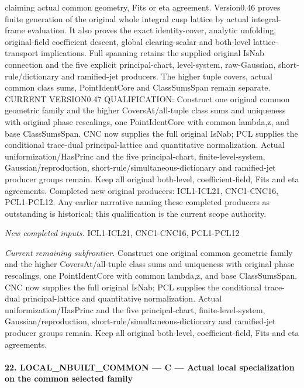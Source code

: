 claiming actual common geometry, Fits or eta agreement. Version0.46 proves finite generation of the original whole integral cusp lattice by actual integral-frame evaluation. It also proves the exact identity-cover, analytic unfolding, original-field coefficient descent, global clearing-scalar and both-level lattice-transport implications. Full spanning retains the supplied original IsNab connection and the five explicit principal-chart, level-system, raw-Gaussian, short-rule/dictionary and ramified-jet producers. The higher tuple covers, actual common class sums, PointIdentCore and ClassSumsSpan remain separate. CURRENT VERSION0.47 QUALIFICATION: Construct one original common geometric family and the higher CoversAt/all-tuple class sums and uniqueness with original phase rescalings, one PointIdentCore with common lambda,z, and base ClassSumsSpan. CNC now supplies the full original IsNab; PCL supplies the conditional trace-dual principal-lattice and quantitative normalization. Actual uniformization/HasPrinc and the five principal-chart, finite-level-system, Gaussian/reproduction, short-rule/simultaneous-dictionary and ramified-jet producer groups remain. Keep all original both-level, coefficient-field, Fits and eta agreements. Completed new original producers: ICL1-ICL21, CNC1-CNC16, PCL1-PCL12. Any earlier narrative naming these completed producers as outstanding is historical; this qualification is the current scope authority.

\emph{New completed inputs.} ICL1-ICL21, CNC1-CNC16, PCL1-PCL12

\emph{Current remaining subfrontier.} Construct one original common geometric family and the higher CoversAt/all-tuple class sums and uniqueness with original phase rescalings, one PointIdentCore with common lambda,z, and base ClassSumsSpan. CNC now supplies the full original IsNab; PCL supplies the conditional trace-dual principal-lattice and quantitative normalization. Actual uniformization/HasPrinc and the five principal-chart, finite-level-system, Gaussian/reproduction, short-rule/simultaneous-dictionary and ramified-jet producer groups remain. Keep all original both-level, coefficient-field, Fits and eta agreements.



\paragraph{22. LOCAL\_\allowbreak NBUILT\_\allowbreak COMMON — C — Actual local specialization on the common selected family}

